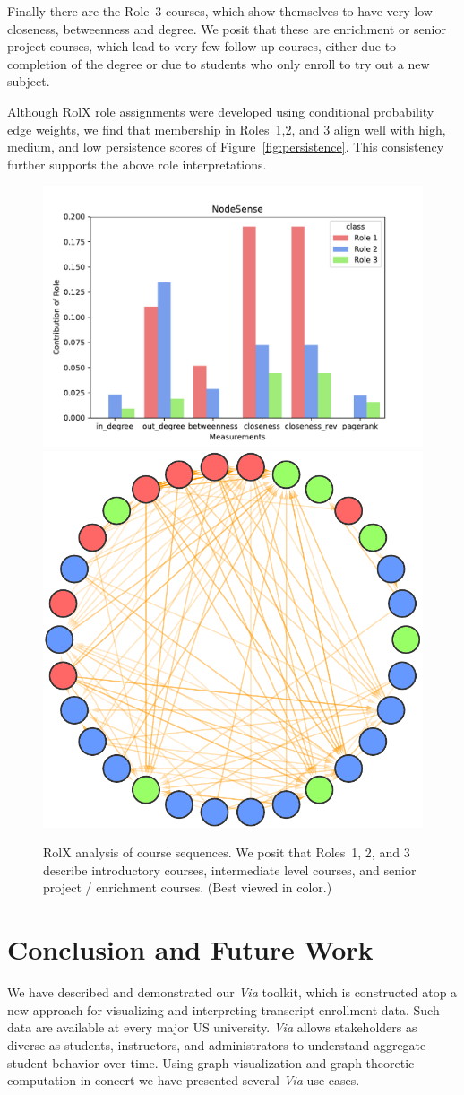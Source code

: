 \documentclass{sigchi}
\begin{document}
Finally there are the Role~3 courses, which show themselves to have very low closeness, betweenness and degree. We posit that these are enrichment or senior project courses, which lead to very few follow up courses, either due to completion of the degree or due to students who only enroll to try out a new subject.  

Although RolX role assignments were developed using conditional
probability edge weights, we find that membership in Roles~1,2, and 3
align well with high, medium, and low persistence scores of
Figure~\ref{fig:persistence}. This consistency further supports the
above role interpretations.

\begin{figure}
    \centering
    \includegraphics[width=0.75\columnwidth]{final-rolx-sense.pdf}
    \includegraphics[width=0.24\columnwidth]{final-rolx.pdf}
    \caption{RolX analysis of course sequences. We posit that Roles~1, 2, and 3 describe introductory courses, intermediate level courses, and senior project / enrichment courses. (Best viewed in color.)}
    \label{fig:rolx}
\end{figure}


\section{Conclusion and Future Work}
\label{sec:conclusion}
We have described and demonstrated our {\em Via} toolkit, which is
constructed atop a new approach for visualizing and interpreting
transcript enrollment data. Such data are available at every major
US university. {\em Via} allows stakeholders as diverse as
students, instructors, and administrators to understand aggregate
student behavior over time. Using graph visualization and graph
theoretic computation in concert we have presented several {\em Via}
use cases.
\end{document}
